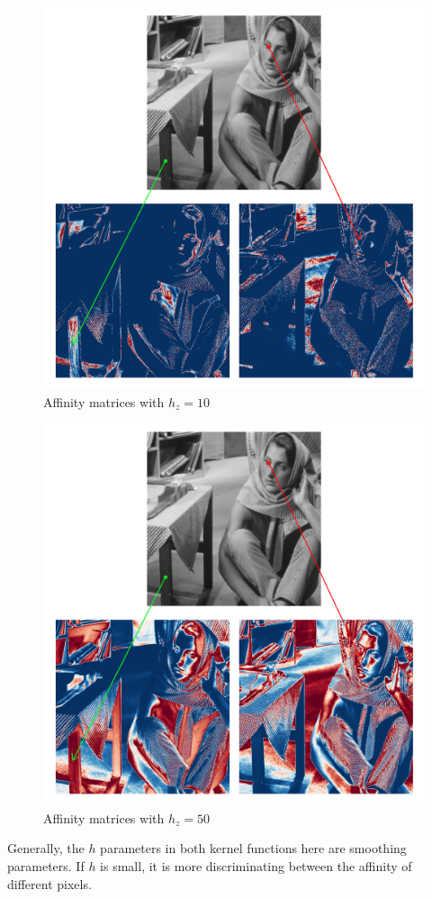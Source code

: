 \begin{description}[align=left]
  \begin{figure}[H]
      \centering
      \includegraphics[width=\textwidth]{img/photometricAffinitySigma10.png}
      \caption{Affinity matrices with \(h_z = 10\)}
  \end{figure}

  \begin{figure}[H]
      \centering
      \includegraphics[width=\textwidth]{img/photometricAffinitySigma50.png}
      \caption{Affinity matrices with \(h_z = 50\)}
  \end{figure}
  Generally, the \(h\) parameters in both kernel functions here are smoothing parameters.
  If \(h\) is small, it is more discriminating between the affinity of different pixels.


\end{description}
